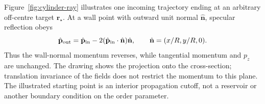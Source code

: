 \documentclass[11pt,a4paper]{article}
\begin{document}
Figure~\ref{fig:cylinder-ray} illustrates one incoming trajectory ending at
an arbitrary off-centre target $\mathbf r_\star$. At a wall point with outward
unit normal $\hat{\mathbf n}$, specular reflection obeys
\begin{equation}
 \hat{\mathbf p}_{\rm out}=\hat{\mathbf p}_{\rm in}
 -2(\hat{\mathbf p}_{\rm in}\cdot\hat{\mathbf n})\hat{\mathbf n},
 \qquad \hat{\mathbf n}=(x/R,y/R,0).
 \label{eq:cylinder-reflection}
\end{equation}
Thus the wall-normal momentum reverses, while tangential momentum and $p_z$
are unchanged. The drawing shows the projection onto the cross-section;
translation invariance of the fields does not restrict the momentum to this
plane. The illustrated starting point is an interior propagation cutoff, not
a reservoir or another boundary condition on the order parameter.
\end{document}
